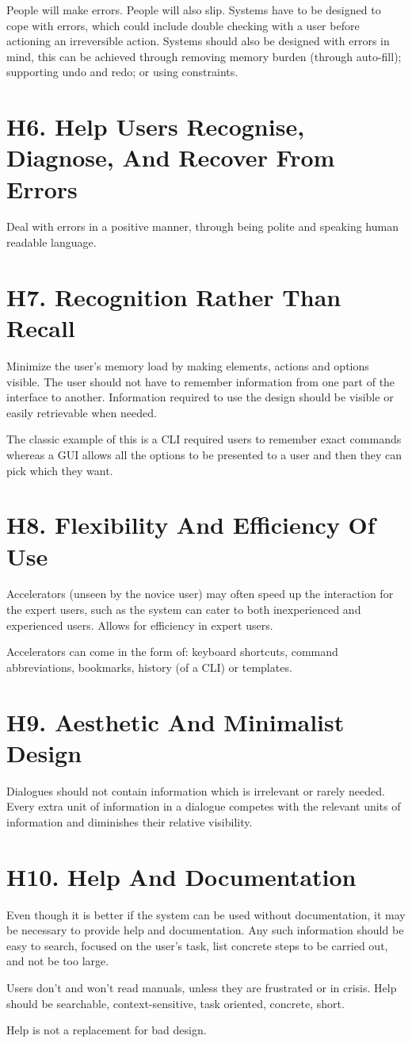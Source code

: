 People will make errors. People will also slip. Systems have to be designed to cope with errors, which could include double checking with a user before actioning an irreversible action. Systems should also be designed with errors in mind, this can be achieved through removing memory burden (through auto-fill); supporting undo and redo; or using constraints. 

\section{H6. Help Users Recognise, Diagnose, And Recover From Errors}
Deal with errors in a positive manner, through being polite and speaking human readable language. 

\section{H7. Recognition Rather Than Recall}
Minimize the user's memory load by making elements, actions and options visible. The user should not have to remember information from one part of the interface to another. Information required to use the design should be visible or easily retrievable when needed. 

The classic example of this is a CLI required users to remember exact commands whereas a GUI allows all the options to be presented to a user and then they can pick which they want.

\section{H8. Flexibility And Efficiency Of Use}
Accelerators (unseen by the novice user) may often speed up the interaction for the expert users, such as the system can cater to both inexperienced and experienced users. Allows for efficiency in expert users.

Accelerators can come in the form of: keyboard shortcuts, command abbreviations, bookmarks, history (of a CLI) or templates. 

\section{H9. Aesthetic And Minimalist Design}
Dialogues should not contain information which is irrelevant or rarely needed. Every extra unit of information in a dialogue competes with the relevant units of information and diminishes their relative visibility.

\section{H10. Help And Documentation}
Even though it is better if the system can be used without documentation, it may be necessary to provide help and documentation. Any such information should be easy to search, focused on the user's task, list concrete steps to be carried out, and not be too large.

Users don't and won't read manuals, unless they are frustrated or in crisis. Help should be searchable, context-sensitive, task oriented, concrete, short. 

Help is not a replacement for bad design. 